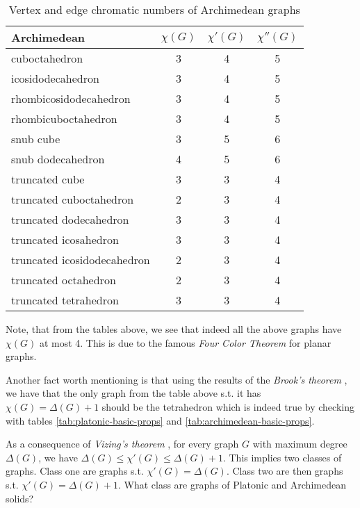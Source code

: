 \begin{table}[H]
\centering
\caption{Vertex and edge chromatic numbers of Archimedean graphs}
\vspace{5pt}
\label{tab:archimedean-chrom-nums}
\begin{tabular}{|l|c|c|c|}
\hline
Archimedean & $\chi(G)$ & $\chi'(G)$ & $\chi''(G)$ \\
\hline\hline
cuboctahedron & 3 & 4 & 5 \\
\hline
icosidodecahedron & 3 & 4 & 5 \\
\hline
rhombicosidodecahedron & 3 & 4 & 5 \\
\hline
rhombicuboctahedron & 3 & 4 & 5 \\
\hline
snub cube & 3 & 5 & 6 \\
\hline
snub dodecahedron & 4 & 5 & 6 \\
\hline
truncated cube & 3 & 3 & 4 \\
\hline
truncated cuboctahedron & 2 & 3 & 4 \\
\hline
truncated dodecahedron & 3 & 3 & 4 \\
\hline
truncated icosahedron & 3 & 3 & 4 \\
\hline
truncated icosidodecahedron & 2 & 3 & 4 \\
\hline
truncated octahedron & 2 & 3 & 4 \\
\hline
truncated tetrahedron & 3 & 3 & 4 \\
\hline
\end{tabular}
\end{table}

Note, that from the tables above, we see that indeed all the above graphs have $\chi(G)$ at most 4. This is due to the famous \textit{Four Color Theorem} \cite{appelhaken76} for planar graphs.

\begin{highlight}

Another fact worth mentioning is that using the results of the \textit{Brook's theorem} \cite{brooks41}, we have that the only graph from the table above s.t. it has $\chi(G) = \Delta(G) + 1$ should be the tetrahedron which is indeed true by checking with tables \ref{tab:platonic-basic-props} and \ref{tab:archimedean-basic-props}. 

\end{highlight}

As a consequence of \textit{Vizing's theorem} \cite{misra92}, for every graph $G$ with maximum degree $\Delta(G)$, we have $\Delta(G) \leq \chi'(G) \leq \Delta(G) + 1$. This implies two classes of graphs. Class one are graphs s.t. $\chi'(G) = \Delta(G)$. Class two are then graphs s.t. $\chi'(G) = \Delta(G) + 1$. What class are graphs of Platonic and Archimedean solids?

